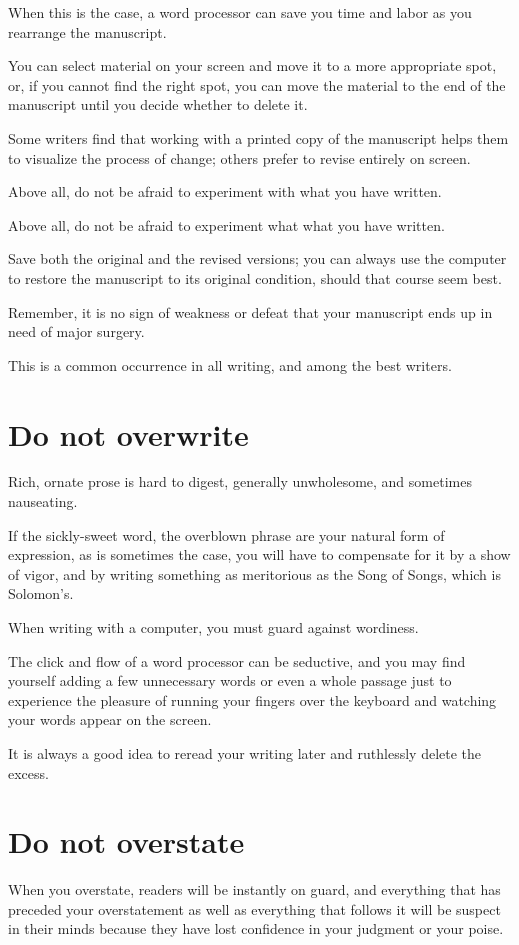 \documentclass{book}
\numberwithin{equation}{section}
\begin{document}
When this is the case, a word processor can save you time and labor as you rearrange the manuscript.

You can select material on your screen and move it to a more appropriate spot, or, if you cannot find the right spot, you can move the material to the end of the manuscript until you decide whether to delete it.

Some writers find that working with a printed copy of the manuscript helps them to visualize the process of change; others prefer to revise entirely on screen.

Above all, do not be afraid to experiment with what you have written.

Above all, do not be afraid to experiment what what you have written.

Save both the original and the revised versions; you can always use the computer to restore the manuscript to its original condition, should that course seem best.

Remember, it is no sign of weakness or defeat that your manuscript ends up in need of major surgery.

This is a common occurrence in all writing, and among the best writers.

\section{Do not overwrite}
Rich, ornate prose is hard to digest, generally unwholesome, and sometimes nauseating.

If the sickly-sweet word, the overblown phrase are your natural form of expression, as is sometimes the case, you will have to compensate for it by a show of vigor, and by writing something as meritorious as the Song of Songs, which is Solomon's.

%
When writing with a computer, you must guard against wordiness.

The click and flow of a word processor can be seductive, and you may find yourself adding a few unnecessary words or even a whole passage just to experience the pleasure of running your fingers over the keyboard and watching your words appear on the screen.

It is always a good idea to reread your writing later and ruthlessly delete the excess.

\section{Do not overstate}
When you overstate, readers will be instantly on guard, and everything that has preceded your overstatement as well as everything that follows it will be suspect in their minds because they have lost confidence in your judgment or your poise.
\end{document}

